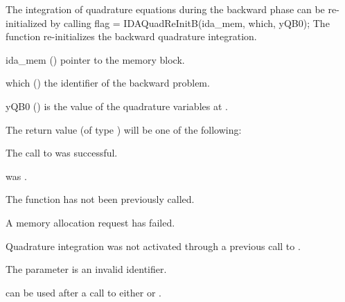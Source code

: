 The integration of quadrature equations during the backward phase can be
re-initialized by calling
{
  flag = IDAQuadReInitB(ida\_mem, which, yQB0);
}
{
  The function  re-initializes the backward quadrature integration.
}
{
  \begin{args}
  \item[ida\_mem] ()
    pointer to the {\idas} memory block.
  \item[which] ()
    the identifier of the backward problem.
  \item[yQB0] ()
    is the value of the quadrature variables at .
  \end{args}
}
{
  The return value  (of type ) will be one of the following:
  \begin{args}
  \item[\Id{IDA\_SUCCESS}]
    The call to  was successful.
 \item[\Id{IDA\_MEM\_NULL}] 
     was .
  \item[\Id{IDA\_NO\_ADJ}]
    The function  has not been previously called.
  \item[\Id{IDA\_MEM\_FAIL}] 
    A memory allocation request has failed.
  \item[\Id{IDA\_NO\_QUAD}] 
    Quadrature integration was not activated through a  previous 
    call to .
  \item[\Id{IDA\_ILL\_INPUT}]
    The parameter  is an invalid identifier.
  \end{args}
}
{
   can be used after a call to either 
  or .
}

